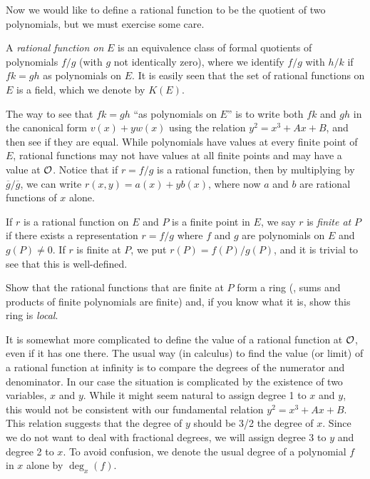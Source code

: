 Now we would like to define a rational function to be the quotient of two polynomials, but we must exercise some care.

\begin{defi}
\label{d3.3}
A {\it rational function on} $E$ is an equivalence class of formal quotients of polynomials $f/g$ (with $g$ not identically zero), where we identify $f/g$ with $h/k$ if $fk=gh$ as polynomials on $E$. It is easily seen that the set of rational functions on $E$ is a field, which we denote by $K(E)$.
\end{defi}

The way to see that $fk=gh$ ``as polynomials on $E$'' is to write both $fk$ and $gh$ in the canonical form $v(x)+yw(x)$ using the relation $y^{2}=x^{3}+Ax+B$, and then see if they are equal. While polynomials have values at every finite point of $E$, rational functions may not have values at all finite points and may have a value at $\mathcal{O}$. Notice that if $r=f/g$ is a rational function, then by multiplying by $\overline{g}/\overline{g}$, we can write $r(x,y)=a(x)+yb(x)$, where now $a$ and $b$ are rational functions of $x$ alone.

\begin{defi}
\label{d3.4}
If $r$ is a rational function on $E$ and $P$ is a finite point in $E$, we say $r$ is {\it finite at} $P$ if there exists a representation $r=f/g$ where $f$ and $g$ are polynomials on $E$ and $g(P)\neq 0$. If $r$ is finite at $P$, we put $r(P)=f(P)/g(P)$, and it is trivial to see that this is well-defined.
\end{defi}

\begin{exo}
\label{e3.5}
Show that the rational functions that are finite at $P$ form a ring (\ie, sums and products of finite polynomials are finite) and, if you know what it is, show this ring is {\it local}.
\end{exo}

It is somewhat more complicated to define the value of a rational function at $\mathcal{O}$, even if it has one there. The usual way (in calculus) to find the value (or limit) of a rational function at infinity is to compare the degrees of the numerator and denominator. In our case the situation is complicated by the existence of two variables, $x$ and $y$. While it might seem natural to assign degree 1 to $x$ and $y$, this would not be consistent with our fundamental relation $y^{2}=x^{3}+Ax+B$. This relation suggests that the degree of $y$ should be 3/2 the degree of $x$. Since we do not want to deal with fractional degrees, we will assign degree 3 to $y$ and degree 2 to $x$. To avoid confusion, we denote the usual degree of a polynomial $f$ in $x$ alone by $\deg_{x}(f)$.

